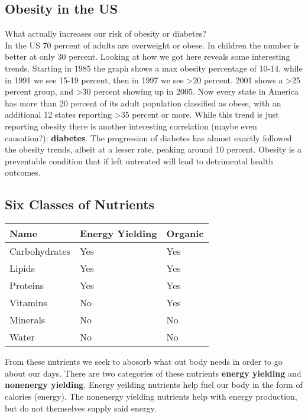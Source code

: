\documentclass[letterpaper, 11pt]{article}
\begin{document}
\subsection{Obesity in the US}
\label{sec:org7528b4b}
What actually increases our risk of obesity or diabetes?\\

In the US 70 percent of adults are overweight or obese. In children the number is better at only 30 percent. Looking at how we got here reveals some interesting trends. Starting in 1985 the graph shows a max obesity percentage of 10-14, while in 1991 we see 15-19 percent, then in 1997 we see >20 percent. 2001 shows a >25 percent group, and >30 percent showing up in 2005. Now every state in America has more than 20 percent of its adult population classified as obese, with an additional 12 states reporting >35 percent or more. While this trend is just reporting obesity there is another interesting correlation (maybe even causation?): \textbf{diabetes}. The progression of diabetes has almost exactly followed the obesity trends, albeit at a lesser rate, peaking around 10 percent. Obesity is a preventable condition that if left untreated will lead to detrimental health outcomes.\\
\subsection{Six Classes of Nutrients}
\label{sec:orgeb119cf}
\begin{center}
\begin{tabular}{lll}
Name & Energy Yielding & Organic\\
\hline
Carbohydrates & Yes & Yes\\
Lipids & Yes & Yes\\
Proteins & Yes & Yes\\
Vitamins & No & Yes\\
Minerals & No & No\\
Water & No & No\\
\end{tabular}
\end{center}
From these nutrients we seek to abosorb what out body needs in order to go about our days. There are two categories of these nutrients \textbf{energy yielding} and \textbf{nonenergy yielding}. Energy yeilding nutrients help fuel our body in the form of calories (energy). The nonenergy yielding nutrients help with energy production, but do not themselves supply said energy.\\
\end{document}
